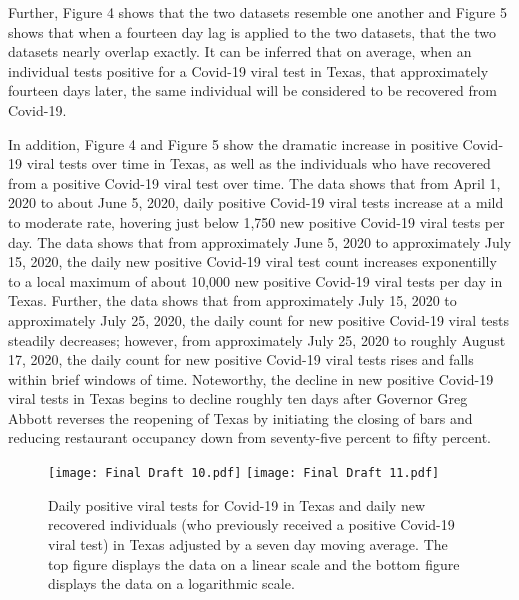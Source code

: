\documentclass{article}
\begin{document}
\vspace{2mm}

Further, Figure 4  shows that the two datasets resemble one another and Figure 5 shows that when a fourteen day lag is applied to the two datasets, that the two datasets nearly overlap exactly. It can be inferred that on average, when an individual tests positive for a Covid-19 viral test in Texas, that approximately fourteen days later, the same individual will be considered to be recovered from Covid-19. 

In addition, Figure 4 and Figure 5 show the dramatic increase in positive Covid-19 viral tests over time in Texas, as well as the individuals who have recovered from a positive Covid-19 viral test over time. The data shows that from April 1, 2020 to about June 5, 2020, daily positive Covid-19 viral tests increase at a mild to moderate rate, hovering just below 1,750 new positive Covid-19 viral tests per day. The data shows that from approximately June 5, 2020 to approximately July 15, 2020, the daily new positive Covid-19 viral test count increases exponentilly to a local maximum of about 10,000 new positive Covid-19 viral tests per day in Texas. Further, the data shows that from approximately July 15, 2020 to approximately July 25, 2020, the daily count for new positive Covid-19 viral tests steadily decreases; however, from approximately July 25, 2020 to roughly August 17, 2020, the daily count for new positive Covid-19 viral tests rises and falls within brief windows of time. Noteworthy, the decline in new positive Covid-19 viral tests in Texas begins to decline roughly ten days after Governor Greg Abbott reverses the reopening of Texas by initiating the closing of bars and reducing restaurant occupancy down from seventy-five percent to fifty percent. 


\begin{figure}[!htbp]
	\begin{center}
		\texttt{[image: Final Draft 10.pdf]}
		\vspace{1mm}
		\texttt{[image: Final Draft 11.pdf]}
		\caption{Daily positive viral tests for Covid-19 in Texas and daily new recovered individuals (who previously received a positive Covid-19 viral test) in Texas adjusted by a seven day moving average. The top figure displays the data on a linear scale and the bottom figure displays the data on a logarithmic scale. }
		\label{fig:4}
	\end{center}
\end{figure}
\end{document}
